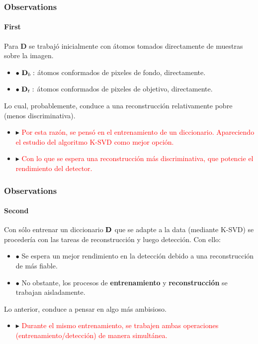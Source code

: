 \documentclass[spanish,xcolor=dvipsnames]{beamer}
\begin{document}
\begin{frame}
	\frametitle{Observations}
	\framesubtitle{First}

Para {\bf D} se trabajó inicialmente con átomos tomados directamente de muestras sobre la imagen.	

	\begin {itemize}
		\item [\color {black} \bf $\bullet$] ${\bf D}_b:$ átomos conformados de pixeles de fondo, directamente.
		\item [\color {black} \bf $\bullet$] ${\bf D}_t:$ átomos conformados de pixeles de objetivo, directamente.
	\end {itemize}

Lo cual, probablemente, conduce a una reconstrucción relativamente pobre (menos discriminativa).

	\begin {itemize}
		\item [\color {red} \bf $\blacktriangleright$] \textcolor{red} {Por esta razón, se pensó en el entrenamiento de un diccionario. Apareciendo el estudio del algoritmo K-SVD como mejor opción.}
	\item [\color {red} \bf $\blacktriangleright$] \textcolor{red} {Con lo que se espera una reconstrucción más discriminativa, que potencie el rendimiento del detector.}
	\end {itemize}

\end{frame}	




 
 \begin{frame}
 	\frametitle{Observations}
 	\framesubtitle{Second}
 
Con sólo entrenar un diccionario ${\bf D}$ que se adapte a la data (mediante K-SVD) se procedería con las tareas de reconstrucción y luego detección. Con ello:

	\begin {itemize}
		\item [\color {black} \bf $\bullet$] Se espera un mejor rendimiento en la detección debido a una reconstrucción de más fiable.
		\item [\color {black} \bf $\bullet$] No obstante, los procesos de {\bf entrenamiento} y {\bf reconstrucción} se trabajan aisladamente.
	\end {itemize}

	Lo anterior, conduce a pensar en algo más ambisioso.

	\begin {itemize}
		\item [\color {red} \bf $\blacktriangleright$] \textcolor {red} {Durante el mismo entrenamiento, se trabajen ambas operaciones (entrenamiento/detección) de manera simultánea.}
	\end {itemize}
 	
 \end{frame}
 
\end{document}
